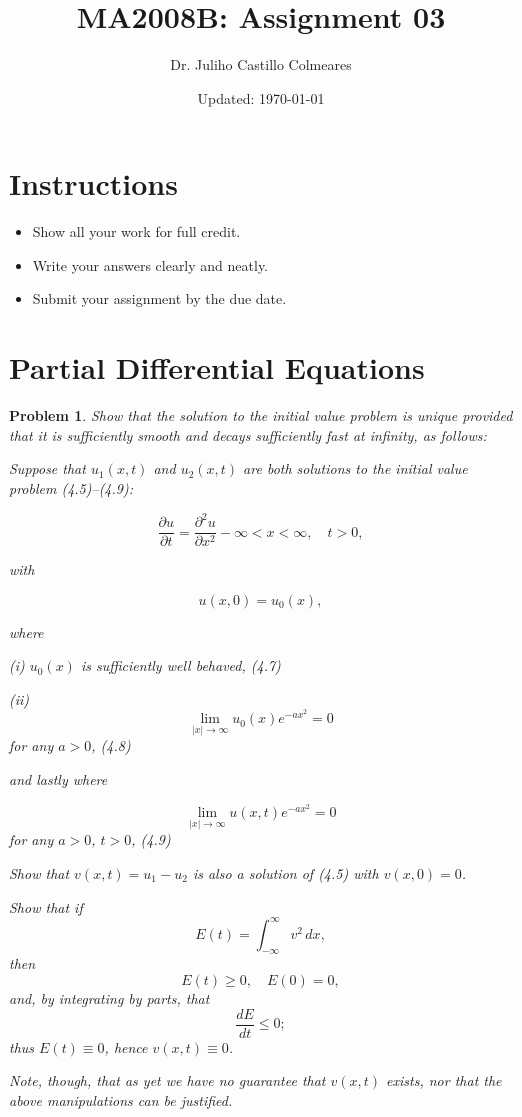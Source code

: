 \documentclass[12pt]{article}
\title{MA2008B: Assignment 03}
\author{Dr. Juliho Castillo Colmeares}
\date{Updated: \today}
\newtheorem{problem}{Problem}[section]
\begin{document}
\maketitle

\section*{Instructions}
\begin{itemize}
    \item Show all your work for full credit.
    \item Write your answers clearly and neatly.
    \item Submit your assignment by the due date.
\end{itemize}

\section{Partial Differential Equations}

\begin{problem}
Show that the solution to the initial value problem is unique 
provided that it is sufficiently smooth and decays sufficiently 
fast at infinity, as follows:

Suppose that $u_1(x, t)$ and $u_2(x, t)$ are both solutions to the 
initial value problem (4.5)--(4.9): 

\[\frac{\partial u}{\partial t} = \frac{\partial^2 u}{\partial x^2} - \infty < x < \infty, \quad t > 0, \tag{4.5}\]

with

\[u(x, 0) = u_0(x), \tag{4.6}\]

where

(i) \( u_0(x) \) is sufficiently well behaved, \hspace{20pt} (4.7)

(ii) \[ \lim_{|x|\to\infty} u_0(x)e^{-ax^2} = 0 \] for any \( a > 0 \), \hspace{20pt} (4.8)

and lastly where

\[ \lim_{|x|\to\infty} u(x,t)e^{-ax^2} = 0 \] for any \( a > 0 \), \( t > 0 \), \hspace{20pt} (4.9)

Show that $v(x, t) = u_1 - u_2$ 
is also a solution of (4.5) with $v(x, 0) = 0$. 

Show that if
\[
E(t) = \int_{-\infty}^\infty v^2 \, dx,
\]
then
\[
E(t) \geq 0, \quad E(0) = 0,
\]
and, by integrating by parts, that
\[
\frac{dE}{dt} \leq 0;
\]
thus $E(t) \equiv 0$, hence $v(x, t) \equiv 0$.

Note, though, that as yet we have no guarantee that $v(x, t)$ exists, 
nor that the above manipulations can be justified.
\end{problem}
\end{document}
